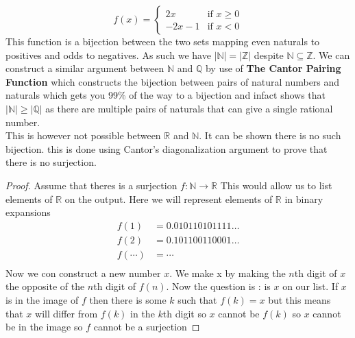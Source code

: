 \documentclass{article}
\begin{document}
    \[f(x) = \begin{cases}
        2x & \text{if } x \ge 0 \\
        -2x-1 & \text{if } x < 0
    \end{cases}\]
This function is a bijection between the two sets mapping even naturals to positives and odds to negatives. As such we have $|\mathbb{N}| = |\mathbb{Z}|$ despite $\mathbb{N} \subseteq \mathbb{Z}$. We can construct a similar argument between $\mathbb{N}$ and $\mathbb{Q}$ by use of \textbf{The Cantor Pairing Function} which constructs the bijection between pairs of natural numbers and naturals which gets you 99\% of the way to a bijection and infact shows that $|\mathbb{N}| \ge |\mathbb{Q}|$ as there are multiple pairs of naturals that can give a single rational number.
\\
This is however not possible between $\mathbb{R}$ and $\mathbb{N}$. It can be shown there is no such bijection. this is done using Cantor's diagonalization argument to prove that there is no surjection. 
\begin{proof}
    Assume that theres is a surjection $f:\mathbb{N}\to \mathbb{R}$ This would allow us to list elements of $\mathbb{R}$ on the output. Here we will represent elements of $\mathbb{R}$ in binary expansions
    \begin{align*}
        f(1) &= 0.010110101111\dots \\
        f(2) &= 0.101100110001\dots \\
        f(\cdots) &= \cdots \\
    \end{align*}
    Now we con construct a new number $x$. We make x by making the $n$th digit of $x$ the opposite of the $n$th digit of $f(n)$. Now the question is : is $x$ on our list. If $x$ is in the image of $f$ then there is some $k$ such that $f(k) = x$ but this means that $x$ will differ from $f(k)$ in the $k$th digit so $x$ cannot be $f(k)$ so $x$ cannot be in the image so $f$ cannot be a surjection
\end{proof}
\end{document}
